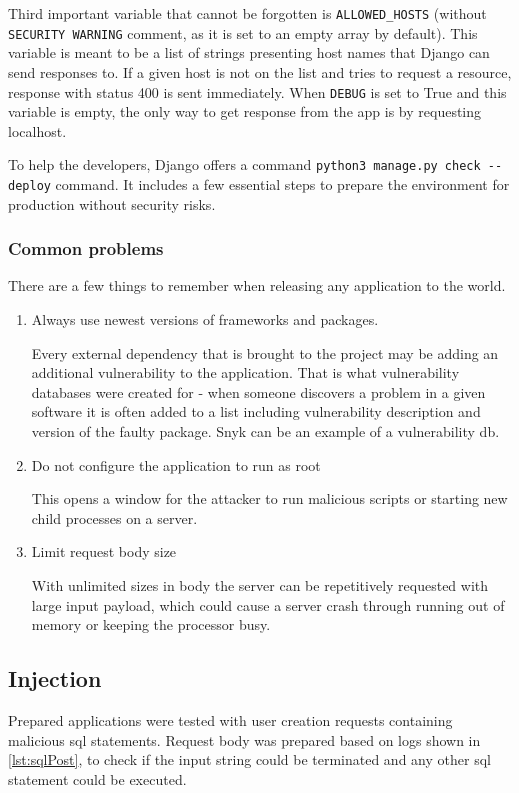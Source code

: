 Third important variable that cannot be forgotten is \lstinline{ALLOWED_HOSTS} (without \lstinline{SECURITY WARNING} comment, as it is set to an empty array by default). This variable is meant to be a list of strings presenting host names that Django can send responses to. If a given host is not on the list and tries to request a resource, response with status 400 is sent immediately. When \lstinline{DEBUG} is set to True and this variable is empty, the only way to get response from the app is by requesting localhost.

To help the developers, Django offers a command \lstinline{python3 manage.py check --deploy} command. It includes a few essential steps to prepare the environment for production without security risks.


\subsubsection{Common problems}
There are a few things to remember when releasing any application to the world.
\begin{enumerate}
      \item Always use newest versions of frameworks and packages.

            Every external dependency that is brought to the project may be adding an additional vulnerability to the application. That is what vulnerability databases were created for - when someone discovers a problem in a given software it is often added to a list including vulnerability description and version of the faulty package. Snyk can be an example of a vulnerability \acrshort{db}. \cite{snyk}

      \item Do not configure the application to run as root

            This opens a window for the attacker to run malicious scripts or starting new child processes on a server.

      \item Limit request body size

            With unlimited sizes in body the server can be repetitively requested with large input payload, which could cause a server crash through running out of memory or keeping the processor busy. \cite{securityMisconfiguration}
\end{enumerate}

\subsection{Injection}
Prepared applications were tested with user creation requests containing malicious \acrshort{sql} statements. Request body was prepared based on logs shown in \ref{lst:sqlPost}, to check if the input string could be terminated and any other \acrshort{sql} statement could be executed.


